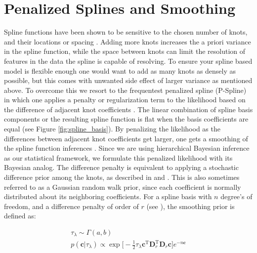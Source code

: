 \appendix
\section{Penalized Splines and Smoothing}\label{sec:psplines}

Spline functions have been shown to be sensitive to the chosen number of knots, and their locations or spacing \citep{deBoor78}. 
Adding more knots increases the a priori variance in the spline function, while the space between knots can limit the 
resolution of features in the data the spline is capable of resolving. To ensure your spline based model is flexible enough 
one would want to add as many knots as densely as possible, but this comes with unwanted side effect of larger variance as mentioned above. 
To overcome this we resort to the frequentest penalized spline (P-Spline) in which one applies a penalty or regularization term 
to the likelihood based on the difference of adjacent knot coefficients \citep{eilers2021practical}. The linear combination of spline basis components 
or the resulting spline function is flat when the basis coefficients are equal (see Figure \ref{fig:spline_basis}). By penalizing the likelihood as 
the differences between adjacent knot coefficients get larger, one gets a smoothing of the spline function inferences \citep{eilers2021practical}. 
Since we are using hierarchical Bayesian inference as our statistical framework, we formulate this penalized likelihood with its Bayesian analog. 
The difference penalty is equivalent to applying a stochastic difference prior among the knots, as described in \citet{BayesianPSplines} and \citet{Jullion2007RobustSO}. 
This is also sometimes referred to as a Gaussian random walk prior, since each coefficient is normally distributed about its neighboring coefficients. 
For a spline basis with $n$ degree's of freedom, and a difference penalty of order of $r$ (see \citet{eilers2021practical}), the smoothing prior is defined as:

\begin{eqnarray}
\tau_\lambda \sim \Gamma(a, b) \\
p(\bm{c} | \tau_\lambda) \propto \exp \big[ -\frac{1}{2} \tau_\lambda \bm{c}^{\mathrm{T}} \bm{D}_{r}^{\mathrm{T}} \bm{D}_r \bm{c}  \big] e^{-n\bm{c}}
\end{eqnarray}


